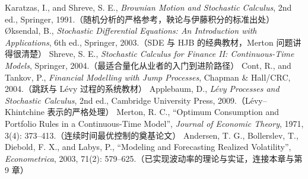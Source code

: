 \begin{furtherreading}
 Karatzas, I., and Shreve, S. E., \emph{Brownian Motion and Stochastic Calculus}, 2nd ed., Springer, 1991.（随机分析的严格参考，鞅论与伊藤积分的标准出处）
 \O ksendal, B., \emph{Stochastic Differential Equations: An Introduction with Applications}, 6th ed., Springer, 2003.（SDE 与 HJB 的经典教材，Merton 问题讲得很清楚）
 Shreve, S. E., \emph{Stochastic Calculus for Finance II: Continuous-Time Models}, Springer, 2004.（最适合量化从业者的入门到进阶路径）
 Cont, R., and Tankov, P., \emph{Financial Modelling with Jump Processes}, Chapman \& Hall/CRC, 2004.（跳跃与 Lévy 过程的系统教材）
 Applebaum, D., \emph{L\'evy Processes and Stochastic Calculus}, 2nd ed., Cambridge University Press, 2009.（Lévy--Khintchine 表示的严格处理）
 Merton, R. C., ``Optimum Consumption and Portfolio Rules in a Continuous-Time Model'', \emph{Journal of Economic Theory}, 1971, 3(4): 373--413.（连续时间最优控制的奠基论文）
 Andersen, T. G., Bollerslev, T., Diebold, F. X., and Labys, P., ``Modeling and Forecasting Realized Volatility'', \emph{Econometrica}, 2003, 71(2): 579--625.（已实现波动率的理论与实证，连接本章与第 9 章）
\end{furtherreading}
